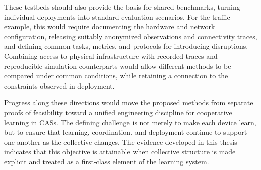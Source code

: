 These testbeds should also provide the basis for shared benchmarks,
 turning individual deployments into standard evaluation scenarios.
%
For the traffic example,
 this would require documenting the hardware and network configuration,
 releasing suitably anonymized observations and connectivity traces,
 and defining common tasks, metrics, and protocols for introducing disruptions.
%
Combining access to physical infrastructure with recorded traces
 and reproducible simulation counterparts would allow different methods
 to be compared under common conditions,
 while retaining a connection to the constraints observed in deployment.

Progress along these directions would move the proposed methods from separate proofs of feasibility
 toward a unified engineering discipline for cooperative learning in \glspl{CAS}.
%
The defining challenge is not merely to make each device learn,
 but to ensure that learning, coordination, and deployment continue
 to support one another as the collective changes.
%
The evidence developed in this thesis indicates that this objective is attainable
 when collective structure is made explicit and treated as a first-class element of the learning system.